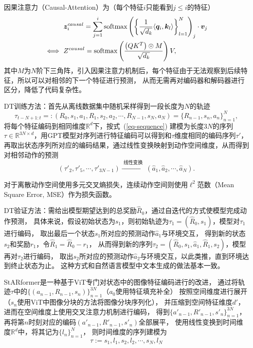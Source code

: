 因果注意力（Causal-Attention）为（每个特征$i$只能看到$j\leqslant i$的特征）
\begin{equation}\label{eq-causal-attn}
\begin{aligned}
  &\ \boldsymbol{z}^{causal}_i = \sum_{j=1}^i\text{softmax}\left(\left\{\frac{1}{\sqrt{d_k}}\langle \boldsymbol{q}_i,\boldsymbol{k}_l\rangle \right\}_{l=1}^N\right)_j\cdot \boldsymbol{v}_j\\
  \iff &\ Z^{causal} = \text{softmax}\left(\frac{\left(QK^T\right)\odot M}{\sqrt{d_k}}\right)V,
\end{aligned}
\end{equation}
其中$M$为$N$阶下三角阵，引入因果注意力机制后，每个特征由于无法观察到后续特征，所以可以对相邻的下一个特征进行预测，
从而无需再对编码器和解码器进行区分，降低了代码复杂性。

DT训练方法：首先从离线数据集中随机采样得到一段长度为$N$的轨迹
\begin{equation}
  \tau_{t-N+1:t} =: (R_0,s_1,a_1,R_1,s_2,a_2,\cdots,R_{N-1},s_N,a_N) = \{R_{n-1},s_n,a_n\}_{n=1}^N,
\end{equation}
将每个特征编码到相同维度$\mathbb{R}^d$下，按式~(\ref{eq-sequence})
建模为长度$3N$的序列$\tau\in\mathbb{R}^{3N\times d}$，用GPT模型对序列进行特征编码可以得到和$\tau$维度相同的编码序列$\tau'$，
再取出状态序列所对应的编码结果，通过线性变换映射到动作空间维度，从而得到对相邻动作的预测
\begin{equation}
  (\tau'_2,\tau'_5,\cdots, \tau'_{3N-1})\xrightarrow{\text{~线性变换~}}
  (\hat{a}_1,\hat{a}_2,\cdots,  \hat{a}_{N}).
\end{equation}

对于离散动作空间使用多元交叉熵损失，连续动作空间则使用$\ell^2$范数（Mean Square Error, MSE）作为损失函数。

DT验证方法：需给出模型期望达到的总奖励$\hat{R}_0$，通过自迭代的方式使模型完成动作预测，
具体来说，假设初始状态为$s_1$，则初始轨迹为$\tau_1=(\hat{R}_0,s_1)$，模型对$\tau_1$进行编码，
取出最后一个状态$s_1$所对应的预测动作$\hat{a}_1$与环境交互，
得到新的状态$s_2$和奖励$r_1$，令$\hat{R}_1 = \hat{R}_0 - r_1$，
从而得到新的序列$\tau_2 = (\hat{R}_0,s_1,\hat{a}_1, \hat{R}_1, s_2)$，模型再对$\tau_2$进行编码，
取出$s_2$所对应的预测动作$\hat{a}_2$与环境交互，以此类推，直到环境达到终止状态为止。
这种方式和自然语言模型中文本生成的做法基本一致。

StARformer是一种基于ViT专门对状态中的图像特征编码进行的改进，
通过将轨迹$\tau$中的$\{(a_{n-1},R_{n-1},s_{n})\}_{n=1}^{3N}$（$a_0$使用特征填充补全）
按照空间维度进行展开（$s_{n}$使用ViT中图像分块的方法将图像分块序列化），
并压缩到空间特征维度$d'$，进而在空间维度上使用交叉注意力机制进行编码，
得到$\{a'_{n-1},R'_{n-1},s'_{n}\}_{n=1}^{3N}$，
再将第$n$时刻对应的编码$(a'_{n-1},R'_{n-1},s'_{n})$全部展平，
使用线性变换到时间维度$\mathbb{R}^d$中，将其记为$\{l_{n}\}_{n=1}^N$，
则时间维度的序列建模为
\begin{equation}
  \tau:=s_1,l_1,s_2,l_2,\cdots,s_N,l_N
\end{equation}

